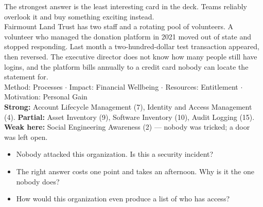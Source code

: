  The strongest answer is the least interesting card in the
deck. Teams reliably overlook it and buy something exciting instead.\\
 Fairmount Land Trust has two staff and a rotating pool of
volunteers. A volunteer who managed the donation platform in 2021 moved out of
state and stopped responding. Last month a two-hundred-dollar test transaction
appeared, then reversed. The executive director does not know how many people
still have logins, and the platform bills annually to a credit card nobody can
locate the statement for.\\
 Method: Processes $\cdot$ Impact:
Financial Wellbeing $\cdot$ Resources: Entitlement $\cdot$ Motivation: Personal
Gain\\
 \textbf{Strong:} Account Lifecycle Management (7), Identity and
Access Management (4). \textbf{Partial:} Asset Inventory (9), Software Inventory
(10), Audit Logging (15). \textbf{Weak here:} Social Engineering Awareness (2)
--- nobody was tricked; a door was left open.\\
\begin{itemize}
\item Nobody attacked this organization. Is this a security incident?
\item The right answer costs one point and takes an afternoon. Why is it the one
nobody does?
\item How would this organization even produce a list of who has access?
\end{itemize}

